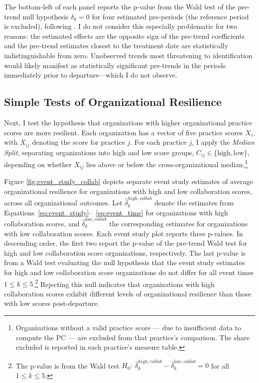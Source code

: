 \documentclass[12pt,notitlepage]{article}
\begin{document}
The bottom-left of each panel reports the p-value from the Wald test of the pre-trend null hypothesis $\delta_k = 0$ for four estimated pre-periods (the reference period is excluded), following \citealt{freyaldenhoven_visualization_2021}. 
I do not consider this especially problematic for two reasons: the estimated effects are the opposite sign of the pre-trend coefficients and the pre-trend estimates closest to the treatment date are statistically indistinguishable from zero.
Unobserved trends most threatening to identification would likely manifest as statistically significant pre-trends in the periods immediately prior to departure—which I do not observe.

\subsection{Simple Tests of Organizational Resilience} \label{sec:org_resilience_indiv_tests}
Next, I test the hypothesis that organizations with higher organizational practice scores are more resilient.
Each organization has a vector of five practice scores $X_i$, with $X_{ij}$ denoting the score for practice $j$. 
For each practice $j$, I apply the \textit{Median Split}, separating organizations into high and low score groups, $C_{ij} \in \{\text{high}, \text{low}\}$, depending on whether $X_{ij}$ lies above or below the cross-organizational median.\footnote{Organizations without a valid practice score — due to insufficient data to compute the PC — are excluded from that practice's comparison.
The share excluded is reported in each practice's measure table.}



Figure \ref{fig:event_study_collab} depicts separate event study estimates of average organizational resilience for organizations with high and low collaboration scores, across all organizational outcomes. 
Let $\hat{\delta}_k^{high,collab}$ denote the estimates from Equations~\ref{eq:event_study}--~\ref{eq:event_time} for organizations with high collaboration scores, and  $\hat{\delta}_k^{low,collab}$ the corresponding estimates for organizations with low collaboration scores.
Each event study plot reports three p-values.
In descending order, the first two report the p-value of the pre-trend Wald test for high and low collaboration score organizations, respectively.
The last p-value is from a Wald test evaluating the null hypothesis that the event study estimates for high and low collaboration score organizations do not differ for all event times $1 \leq k \leq 5$.\footnote{
The p-value is from the Wald test  $H_0:\ \hat{\delta}_k^{high,collab} - \hat{\delta}_k^{low,collab} = 0$ for all $1 \le k \le 5$.}
Rejecting this null indicates that organizations with high collaboration scores exhibit different levels of organizational resilience than those with low scores post-departure.
\end{document}
